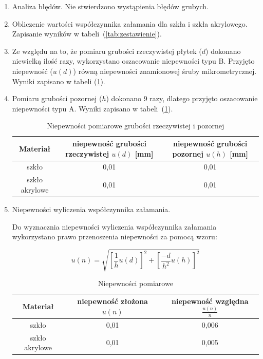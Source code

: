 \documentclass [a4paper,11pt]{article}
\begin{document}
\begin{enumerate}[label=\alph*)]
		\item Analiza błędów.
		Nie stwierdzono wystąpienia błędów grubych.
		
		\item Obliczenie wartości współczynnika załamania dla szkła i szkła akrylowego. Zapisanie wyników w tabeli~(\ref{tab:zestawienie}).
		
		\item Ze względu na to, że pomiaru grubości rzeczywistej płytek ($d$) dokonano niewielką ilość razy, wykorzystano oszacowanie niepewności typu B. Przyjęto niepewność ($u(d)$) równą niepewności znamionowej śruby mikrometrycznej. Wyniki zapisano w tabeli (\ref{tab:niephd}).
		
		\item Pomiaru grubości pozornej ($h$) dokonano 9 razy, dlatego przyjęto oszacowanie niepewności typu A. Wyniki zapisano w tabeli~(\ref{tab:niephd}).
		
		\begin{table}[!h]
			\caption{Niepewności pomiarowe grubości rzeczywistej i pozornej}
			\label{tab:niephd}
			\begin{center}
				\begin{tabular}{|c|c|c|}
					\hline Materiał & niepewność grubości rzeczywistej $u(d)$ [mm] & niepewność grubości pozornej $u(h)$ [mm] \\
					\hline szkło & 0,01 & 0,01 \\
					\hline szkło akrylowe & 0,01 & 0,01 \\
					\hline 
				\end{tabular} 
			\end{center}
		\end{table}
		
		\item Niepewności wyliczenia współczynnika załamania.
		
		Do wyznacznia niepewności wyliczenia współczynnika załamania wykorzystano prawo przenoszenia niepewności za pomocą wzoru:
		
		\begin{equation}
		\label{eq:niepewnosczlozona}
		u(n) = \sqrt{\left[ \frac{1}{h}u(d) \right]^2 + \left[ \frac{-d}{h^2}u(h) \right]^2}
		\end{equation}
		\begin{table}[!h]
			\caption{Niepewności pomiarowe}
			\label{tab:niepewnosci}
			\begin{center}
				\begin{tabular}{|c|c|c|}
					\hline Materiał & niepewność złożona $u(n)$ & niepewność względna $\frac{u(n)}{n}$ \\
					\hline szkło & 0,01 & 0,006 \\
					\hline szkło akrylowe & 0,01 & 0,005 \\
					\hline 
				\end{tabular} 
			\end{center}
		\end{table}
		

\end{enumerate}
\end{document}
